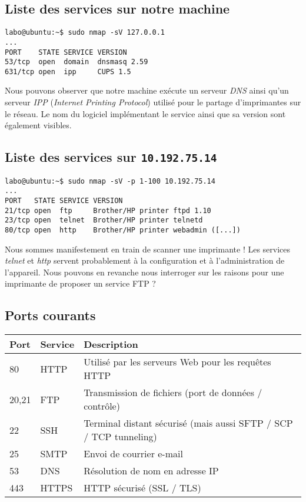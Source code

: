 \documentclass[11pt,a4paper]{article}
\begin{document}
\subsection{Liste des services sur notre machine}

\begin{verbatim}
labo@ubuntu:~$ sudo nmap -sV 127.0.0.1
...
PORT    STATE SERVICE VERSION
53/tcp  open  domain  dnsmasq 2.59
631/tcp open  ipp     CUPS 1.5
\end{verbatim}

Nous pouvons observer que notre machine exécute un serveur \textit{DNS} ainsi qu'un serveur \textit{IPP} (\textit{Internet Printing Protocol}) utilisé pour le partage d'imprimantes sur le réseau. Le nom du logiciel implémentant le service ainsi que sa version sont également visibles.

\subsection{Liste des services sur \texttt{10.192.75.14}}

\begin{verbatim}
labo@ubuntu:~$ sudo nmap -sV -p 1-100 10.192.75.14
...
PORT   STATE SERVICE VERSION
21/tcp open  ftp     Brother/HP printer ftpd 1.10
23/tcp open  telnet  Brother/HP printer telnetd
80/tcp open  http    Brother/HP printer webadmin ([...])
\end{verbatim}

Nous sommes manifestement en train de scanner une imprimante ! Les services \textit{telnet} et \textit{http} servent probablement à la configuration et à l'administration de l'appareil. Nous pouvons en revanche nous interroger sur les raisons pour une imprimante de proposer un service FTP ?

\subsection{Ports courants}

\begin{tabular}{|l|l|p{12cm}|}
	\hline
	\textbf{Port} & \textbf{Service} & \textbf{Description} \\
	\hline
	80    & HTTP & Utilisé par les serveurs Web pour les requêtes HTTP \\
	20,21 & FTP & Transmission de fichiers (port de données / contrôle) \\
	22    & SSH & Terminal distant sécurisé (mais aussi SFTP / SCP / TCP tunneling) \\
	25    & SMTP & Envoi de courrier e-mail \\
	53    & DNS & Résolution de nom en adresse IP \\
	443   & HTTPS & HTTP sécurisé (SSL / TLS) \\
	\hline
\end{tabular}
\end{document}

